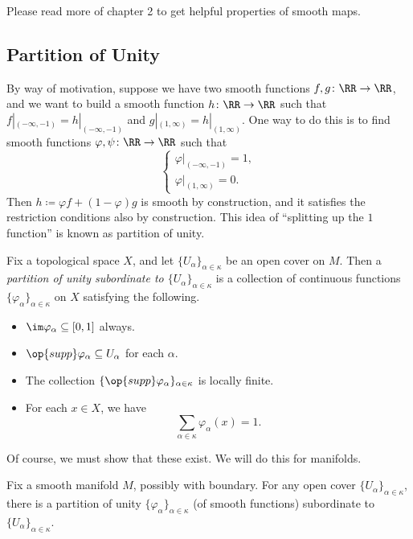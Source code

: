\documentclass[../notes.tex]{subfiles}
\begin{document}
\begin{remark}
	Please read more of chapter 2 to get helpful properties of smooth maps.
\end{remark}

\subsection{Partition of Unity}
By way of motivation, suppose we have two smooth functions $f,g\colon\RR\to\RR$, and we want to build a smooth function $h\colon\RR\to\RR$ such that $f|_{(-\infty,-1)}=h|_{(-\infty,-1)}$ and $g|_{(1,\infty)}=h|_{(1,\infty)}$. One way to do this is to find smooth functions $\varphi,\psi\colon\RR\to\RR$ such that 
\[\begin{cases}
	\varphi|_{(-\infty,-1)}=1, \\
	\varphi|_{(1,\infty)}=0.
\end{cases}\]
Then $h\coloneqq\varphi f+(1-\varphi)g$ is smooth by construction, and it satisfies the restriction conditions also by construction. This idea of ``splitting up the $1$ function'' is known as partition of unity.
\begin{definition}
	Fix a topological space $X$, and let $\{U_\alpha\}_{\alpha\in\kappa}$ be an open cover on $M$. Then a \textit{partition of unity subordinate to $\{U_\alpha\}_{\alpha\in\kappa}$} is a collection of continuous functions $\{\varphi_\alpha\}_{\alpha\in\kappa}$ on $X$ satisfying the following.
	\begin{itemize}
		\item $\im\varphi_\alpha\subseteq[0,1]$ always.
		\item $\op{supp}\varphi_\alpha\subseteq U_\alpha$ for each $\alpha$.
		\item The collection $\{\op{supp}\varphi_\alpha\}_{\alpha\in\kappa}$ is locally finite.
		\item For each $x\in X$, we have
		\[\sum_{\alpha\in\kappa}\varphi_\alpha(x)=1.\]
	\end{itemize}
\end{definition}
Of course, we must show that these exist. We will do this for manifolds.
\begin{theorem}
	Fix a smooth manifold $M$, possibly with boundary. For any open cover $\{U_\alpha\}_{\alpha\in\kappa}$, there is a partition of unity $\{\varphi_\alpha\}_{\alpha\in\kappa}$ (of smooth functions) subordinate to $\{U_\alpha\}_{\alpha\in\kappa}$.
\end{theorem}
\end{document}

